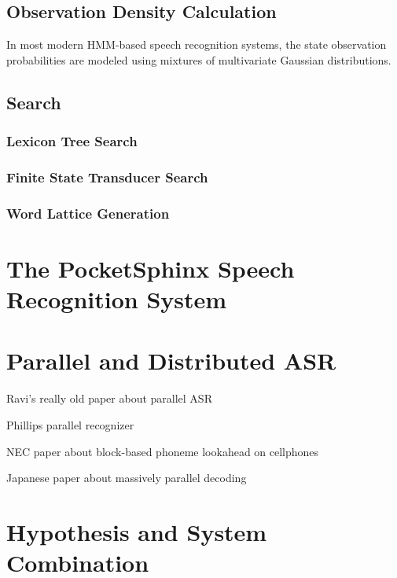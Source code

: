 \documentclass{article}
\begin{document}
\subsection{Observation Density Calculation}
\label{sec:gmm}

In most modern HMM-based speech recognition systems, the state
observation probabilities are modeled using mixtures of multivariate
Gaussian distributions.

\subsection{Search}
\label{sec:search}

\subsubsection{Lexicon Tree Search}
\label{sec:lextree}

\subsubsection{Finite State Transducer Search}
\label{sec:fst}

\subsubsection{Word Lattice Generation}
\label{sec:lattice}

\section{The PocketSphinx Speech Recognition System}
\label{sec:pocketsphinx}

\section{Parallel and Distributed ASR}
\label{sec:pdasr}

Ravi's really old paper about parallel ASR \cite{mosur1993}

Phillips parallel recognizer \cite{phillips1999}

NEC paper about block-based phoneme lookahead on cellphones \cite{ishikawa2006}

Japanese paper about massively parallel decoding \cite{shinozaki2004}

\section{Hypothesis and System Combination}
\label{sec:hypcomb}
\end{document}
